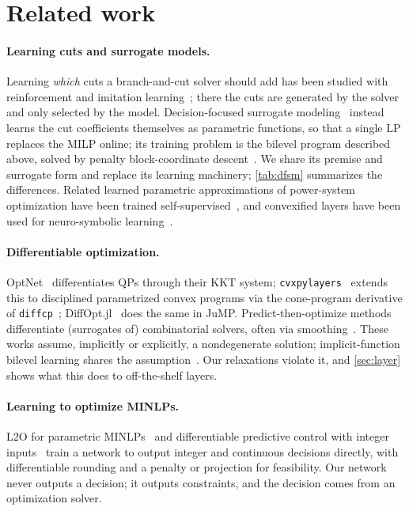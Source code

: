 \documentclass[10pt]{article}
\begin{document}
\section{Related work}
\label{sec:related}

\paragraph{Learning cuts and surrogate models.}
Learning \emph{which} cuts a branch-and-cut solver should add has been studied with reinforcement and imitation learning~\citep{tang2020learningtocut,paulus2022lookahead}; there the cuts are generated by the solver and only selected by the model.
Decision-focused surrogate modeling~\citep{dixit2025dfsm} instead learns the cut coefficients themselves as parametric functions, so that a single LP replaces the MILP online; its training problem is the bilevel program described above, solved by penalty block-coordinate descent~\citep{gupta2023pbcd}.
We share its premise and surrogate form and replace its learning machinery; \cref{tab:dfsm} summarizes the differences.
Related learned parametric approximations of power-system optimization have been trained self-supervised~\citep{anrrango2026sscdcopf}, and convexified layers have been used for neuro-symbolic learning~\citep{pal2026disjunctivenet}.

\paragraph{Differentiable optimization.}
OptNet~\citep{amos2017optnet} differentiates QPs through their KKT system; \texttt{cvxpylayers}~\citep{agrawal2019cvxpylayers} extends this to disciplined parametrized convex programs via the cone-program derivative of \texttt{diffcp}~\citep{agrawal2019diffcp}; DiffOpt.jl~\citep{besancon2023diffopt} does the same in JuMP. Predict-then-optimize methods~\citep{elmachtoub2022spo,wilder2019melding,tang2024pyepo} differentiate (surrogates of) combinatorial solvers, often via smoothing~\citep{berthet2020perturbed,vlastelica2020blackbox}. These works assume, implicitly or explicitly, a nondegenerate solution; implicit-function bilevel learning shares the assumption~\citep{grazzi2026bilevel}. Our relaxations violate it, and \cref{sec:layer} shows what this does to off-the-shelf layers.

\paragraph{Learning to optimize MINLPs.}
L2O for parametric MINLPs~\citep{tang2024l2ominlp} and differentiable predictive control with integer inputs~\citep{boldocky2025midpc} train a network to output integer and continuous decisions directly, with differentiable rounding and a penalty or projection for feasibility. Our network never outputs a decision; it outputs constraints, and the decision comes from an optimization solver.
\end{document}
